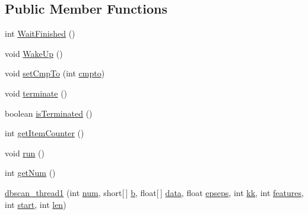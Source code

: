 \subsection*{Public Member Functions}
\begin{DoxyCompactItemize}
\item 
int \mbox{\hyperlink{classcom_1_1example_1_1dmocl_1_1dbscan_1_1dbscan__thread1_a3c90c04f63c52041d59208018429b739}{Wait\+Finished}} ()
\item 
void \mbox{\hyperlink{classcom_1_1example_1_1dmocl_1_1dbscan_1_1dbscan__thread1_af475593d5cbe3c8bbc073fd5ce70408d}{Wake\+Up}} ()
\item 
void \mbox{\hyperlink{classcom_1_1example_1_1dmocl_1_1dbscan_1_1dbscan__thread1_a97c26e24c9b0388efaeaa18172ea7982}{set\+Cmp\+To}} (int \mbox{\hyperlink{classcom_1_1example_1_1dmocl_1_1dbscan_1_1dbscan__thread1_a126ae0f0fb657d8bed0514a83f47b8c4}{cmpto}})
\item 
void \mbox{\hyperlink{classcom_1_1example_1_1dmocl_1_1dbscan_1_1dbscan__thread1_a6461086a24acdb11a63fbc30c799448d}{terminate}} ()
\item 
boolean \mbox{\hyperlink{classcom_1_1example_1_1dmocl_1_1dbscan_1_1dbscan__thread1_a398e2ddf92a5fa5d0519676fb2292931}{is\+Terminated}} ()
\item 
int \mbox{\hyperlink{classcom_1_1example_1_1dmocl_1_1dbscan_1_1dbscan__thread1_ac87f4f4371289e86e068a836c3d8d606}{get\+Item\+Counter}} ()
\item 
void \mbox{\hyperlink{classcom_1_1example_1_1dmocl_1_1dbscan_1_1dbscan__thread1_a992742e37574c5396e0c8755b040846e}{run}} ()
\item 
int \mbox{\hyperlink{classcom_1_1example_1_1dmocl_1_1dbscan_1_1dbscan__thread1_aceaa6df72eade3be9bb48a7583ed5aac}{get\+Num}} ()
\item 
\mbox{\hyperlink{classcom_1_1example_1_1dmocl_1_1dbscan_1_1dbscan__thread1_aea80418400fcb567ddc0b3691398baa3}{dbscan\+\_\+thread1}} (int \mbox{\hyperlink{classcom_1_1example_1_1dmocl_1_1dbscan_1_1dbscan__thread1_a95a0e173c6c23bd5d1416aa9d207742d}{num}}, short\mbox{[}$\,$\mbox{]} \mbox{\hyperlink{classcom_1_1example_1_1dmocl_1_1dbscan_1_1dbscan__thread1_a9a6c463653789946e1e679443fffb75a}{b}}, float\mbox{[}$\,$\mbox{]} \mbox{\hyperlink{classcom_1_1example_1_1dmocl_1_1dbscan_1_1dbscan__thread1_aa9e76d2e3d9ecbf0524c4d8a80471e57}{data}}, float \mbox{\hyperlink{classcom_1_1example_1_1dmocl_1_1dbscan_1_1dbscan__thread1_ace39ecc18d0d9f0a9c641e31c5f97959}{epseps}}, int \mbox{\hyperlink{classcom_1_1example_1_1dmocl_1_1dbscan_1_1dbscan__thread1_a047fd3ab03cf3ddab9317d2004cce994}{kk}}, int \mbox{\hyperlink{classcom_1_1example_1_1dmocl_1_1dbscan_1_1dbscan__thread1_a00a9a411e64b2875f0e465417eab70cd}{features}}, int \mbox{\hyperlink{classcom_1_1example_1_1dmocl_1_1dbscan_1_1dbscan__thread1_ae4fb416661cfe005e777b5a23ec260bf}{start}}, int \mbox{\hyperlink{classcom_1_1example_1_1dmocl_1_1dbscan_1_1dbscan__thread1_ab232593fdc3e759215370c8a7b5b4809}{len}})
\end{DoxyCompactItemize}
